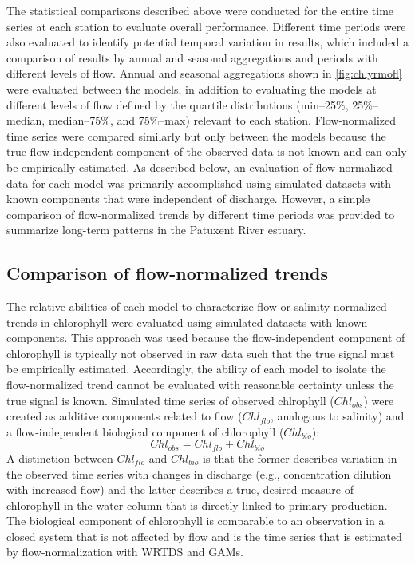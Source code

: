 \documentclass[letterpaper,12pt,oneside]{article}\usepackage[]{graphicx}\usepackage[]{color}
\begin{document}
The statistical comparisons described above were conducted for the entire time series at each station to evaluate overall performance.  Different time periods were also evaluated to identify potential temporal variation in results, which included a comparison of results by annual and seasonal aggregations and periods with different levels of flow.  Annual and seasonal aggregations shown in \cref{fig:chlyrmofl} were evaluated between the models, in addition to evaluating the models at different levels of flow defined by the quartile distributions (min--25\%, 25\%--median, median--75\%, and 75\%--max) relevant to each station.  Flow-normalized time series were compared similarly but only between the models because the true flow-independent component of the observed data is not known and can only be empirically estimated.  As described below, an evaluation of flow-normalized data for each model was primarily accomplished using simulated datasets with known components that were independent of discharge.  However, a simple comparison of flow-normalized trends by different time periods was provided to summarize long-term patterns in the Patuxent River estuary.   

\subsection{Comparison of flow-normalized trends}

The relative abilities of each model to characterize flow or salinity-normalized trends in chlorophyll were evaluated using simulated datasets with known components.  This approach was used because the flow-independent component of chlorophyll is typically not observed in raw data such that the true signal must be empirically estimated.  Accordingly, the ability of each model to isolate the flow-normalized trend cannot be evaluated with reasonable certainty unless the true signal is known.  Simulated time series of observed chlrophyll ($Chl_{obs}$) were created as additive components related to flow ($Chl_{flo}$, analogous to salinity) and a flow-independent biological component of chlorophyll ($Chl_{bio}$):
\begin{equation} \label{chlobs}
Chl_{obs} = Chl_{flo} + Chl_{bio}
\end{equation}
A distinction between $Chl_{flo}$ and $Chl_{bio}$ is that the former describes variation in the observed time series with changes in discharge (e.g., concentration dilution with increased flow) and the latter describes a true, desired measure of chlorophyll in the water column that is directly linked to primary production.  The biological component of chlorophyll is comparable to an observation in a closed system that is not affected by flow and is the time series that is estimated by flow-normalization with \ac{WRTDS} and \acp{GAM}.
\end{document}
